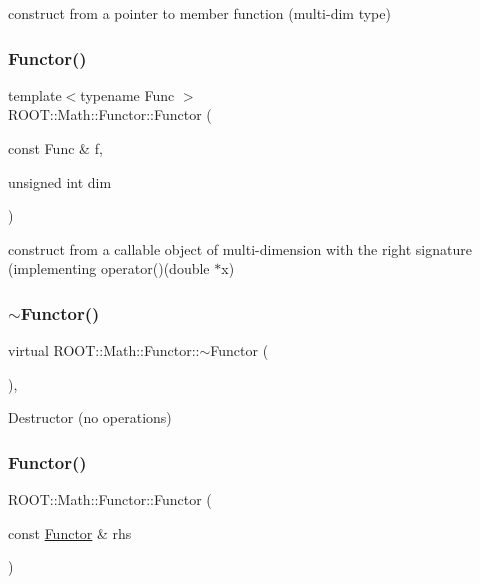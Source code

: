 construct from a pointer to member function (multi-\/dim type) \mbox{\label{classROOT_1_1Math_1_1Functor_a82af0df828055f18310af5d49dcc3aa2}} 
\subsubsection{\texorpdfstring{Functor()}{Functor()}\hspace{0.1cm}{\footnotesize\ttfamily [7/8]}}
{\footnotesize\ttfamily template$<$typename Func $>$ \\
R\+O\+O\+T\+::\+Math\+::\+Functor\+::\+Functor (\begin{DoxyParamCaption}\item[{const Func \&}]{f,  }\item[{unsigned int}]{dim }\end{DoxyParamCaption})\hspace{0.3cm}{\ttfamily [inline]}}

construct from a callable object of multi-\/dimension with the right signature (implementing operator()(double $\ast$x) \mbox{\label{classROOT_1_1Math_1_1Functor_a349935f827a453deb17fdad728849028}} 
\subsubsection{\texorpdfstring{$\sim$Functor()}{~Functor()}\hspace{0.1cm}{\footnotesize\ttfamily [2/2]}}
{\footnotesize\ttfamily virtual R\+O\+O\+T\+::\+Math\+::\+Functor\+::$\sim$\+Functor (\begin{DoxyParamCaption}{ }\end{DoxyParamCaption})\hspace{0.3cm}{\ttfamily [inline]}, {\ttfamily [virtual]}}

Destructor (no operations) \mbox{\label{classROOT_1_1Math_1_1Functor_a001bfe27e95032f05685167e77e0efbd}} 
\subsubsection{\texorpdfstring{Functor()}{Functor()}\hspace{0.1cm}{\footnotesize\ttfamily [8/8]}}
{\footnotesize\ttfamily R\+O\+O\+T\+::\+Math\+::\+Functor\+::\+Functor (\begin{DoxyParamCaption}\item[{const \mbox{\hyperlink{classROOT_1_1Math_1_1Functor}{Functor}} \&}]{rhs }\end{DoxyParamCaption})\hspace{0.3cm}{\ttfamily [inline]}}

